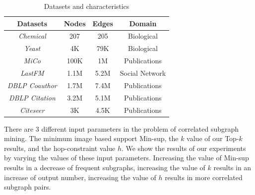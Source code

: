 \begin{table}[tb!]
	\vspace{-2mm}
	\begin{center}
		\vspace{-1mm}
		\centering
		\caption{Datasets and characteristics\label{tab:datasets}}
		\vspace{-3mm}
		\begin{tabular} {cccc}
			\hline
			Datasets  & Nodes & Edges  & Domain\\			 
			\hline 
			{\em Chemical}   &   207    &  205   & Biological\\
			{\em Yeast}   &   4K    &  79K  & Biological\\
			{\em MiCo}   &   100K    &  1M   & Publications\\ 
			{\em LastFM}   &   1.1M   &  5.2M & Social Network\\
			{\em DBLP Coauthor}   &   1.7M    &  7.4M   & Publications\\ 
			{\em DBLP Citation}   &   3.2M   &  5.1M   & Publications\\
			{\em Citeseer}   &   3K   &  4.5K & Publications\\
			
			\hline
		\end{tabular}
	\end{center}
	\vspace{-4mm}
\end{table}


 There are $3$ different input parameters in the problem of correlated subgraph mining. The minimum image based support {\sf Min-sup}, the $k$ value of our {\sf Top-$k$} results, and the hop-constraint value $h$. We show the results of our experiments by varying the values of these input parameters. Increasing the value of {\sf Min-sup} results in a decrease of frequent subgraphs, increasing the value of $k$ results in an increase of output number, increasing the value of $h$ results in more correlated subgraph pairs.



